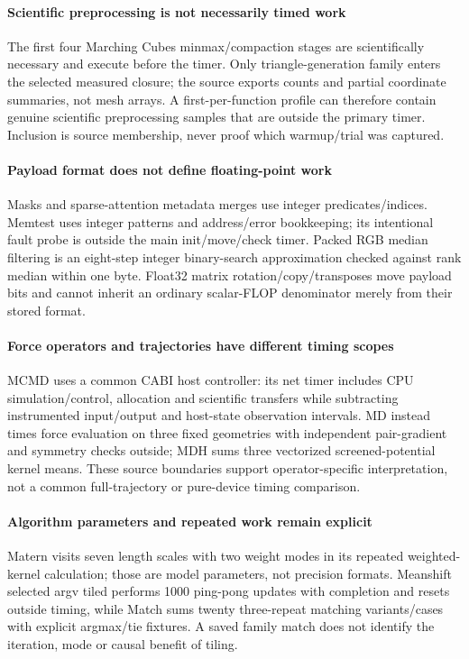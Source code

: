 \paragraph{Scientific preprocessing is not necessarily timed work} The first four Marching Cubes minmax/compaction stages are scientifically necessary and execute before the timer. Only triangle-generation family enters the selected measured closure; the source exports counts and partial coordinate summaries, not mesh arrays. A first-per-function profile can therefore contain genuine scientific preprocessing samples that are outside the primary timer. Inclusion is source membership, never proof which warmup/trial was captured.

\paragraph{Payload format does not define floating-point work} Masks and sparse-attention metadata merges use integer predicates/indices. Memtest uses integer patterns and address/error bookkeeping; its intentional fault probe is outside the main init/move/check timer. Packed RGB median filtering is an eight-step integer binary-search approximation checked against rank median within one byte. Float32 matrix rotation/copy/transposes move payload bits and cannot inherit an ordinary scalar-FLOP denominator merely from their stored format.

\paragraph{Force operators and trajectories have different timing scopes} MCMD uses a common CABI host controller: its net timer includes CPU simulation/control, allocation and scientific transfers while subtracting instrumented input/output and host-state observation intervals. MD instead times force evaluation on three fixed geometries with independent pair-gradient and symmetry checks outside; MDH sums three vectorized screened-potential kernel means. These source boundaries support operator-specific interpretation, not a common full-trajectory or pure-device timing comparison.

\paragraph{Algorithm parameters and repeated work remain explicit} Matern visits seven length scales with two weight modes in its repeated weighted-kernel calculation; those are model parameters, not precision formats. Meanshift selected argv tiled performs 1000 ping-pong updates with completion and resets outside timing, while Match sums twenty three-repeat matching variants/cases with explicit argmax/tie fixtures. A saved family match does not identify the iteration, mode or causal benefit of tiling.
